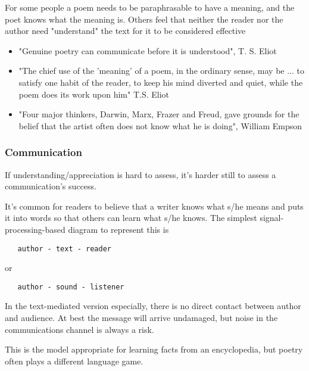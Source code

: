\documentclass[11pt]{article}
\begin{document}
For some people a poem needs to be paraphrasable to have a meaning, and the poet knows what the meaning is. Others feel that neither the reader nor the author need
"understand" the text for it to be considered effective 
\begin{itemize}
\item "Genuine poetry can communicate before it is understood", T. S.
Eliot 
\item "The chief use of the 'meaning' of a poem, in the ordinary                             
sense, may be ... to satisfy one habit of the reader, to keep his mind                                
diverted and quiet, while the poem does its work upon him" T.S. Eliot
\item "Four major thinkers, Darwin, Marx, Frazer and Freud, gave grounds for                            
the belief that the artist often does not know what he is doing", William
Empson

\end{itemize}


\subsubsection*{Communication}

If understanding/appreciation is hard to assess, it's harder still to assess a communication's success. 



It's common for readers to believe that a writer knows what s/he means and puts it into words so that others can learn what s/he knows. The simplest signal-processing-based diagram to represent this is
\begin{verbatim}
   author - text - reader
\end{verbatim}

or
\begin{verbatim}
   author - sound - listener 
\end{verbatim} 

In the text-mediated version
especially, there is no direct contact between author and audience. At best
the message will arrive undamaged, but noise in the communications channel is always a
risk.

This is the model appropriate for learning facts from an encyclopedia, but poetry often plays a different language game.
\end{document}
